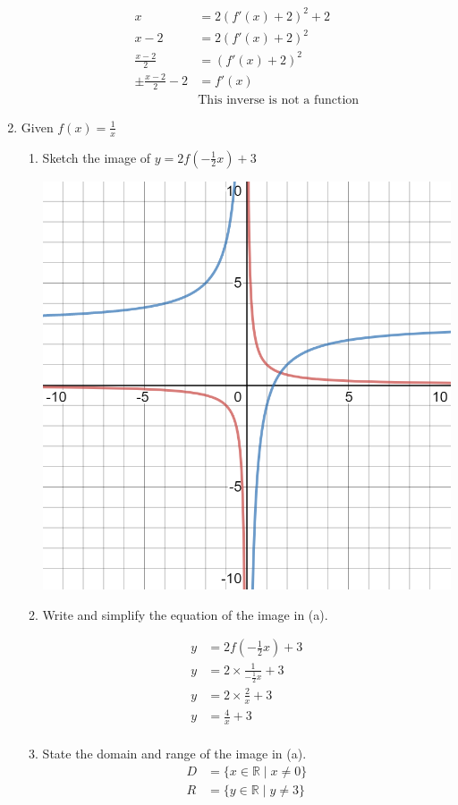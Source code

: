 \documentclass[paper=a4, fontsize=11pt]{scrartcl}
\begin{document}
\begin{enumerate}[resume]
\begin{enumerate}
\begin{align*}
                x&=2(f'(x)+2)^2+2\\
                x-2&=2(f'(x)+2)^2\\
                \frac{x-2}{2}&=(f'(x)+2)^2\\
                \pm\frac{x-2}{2}-2&=f'(x)\\
                &\text{This inverse is not a function}
            \end{align*}
        \end{enumerate}
    \item Given $f(x)=\frac{1}{x}$ %
    \begin{enumerate}
        \item Sketch the image of $y=2f(-\frac{1}{2}x)+3$
        
        \includegraphics[scale=0.1]{MathExamReview/35-graph.png}

        \item Write and simplify the equation of the image in (a).
        
        \begin{align*}
            y&=2f(-\frac{1}{2}x)+3\\
            y&=2\times\frac{1}{-\frac{1}{2}x}+3\\
            y&=2\times\frac{2}{x}+3\\
            y&=\frac{4}{x}+3\\
        \end{align*}
        \item State the domain and range of the image in (a).
        \begin{align*}
            D&=\{x\in\mathbb{R}\mid x\neq 0\}\\
            R&=\{y\in\mathbb{R}\mid y\neq 3\}\\
        \end{align*}
    \end{enumerate}
\end{enumerate}
\printindex
\end{document}
